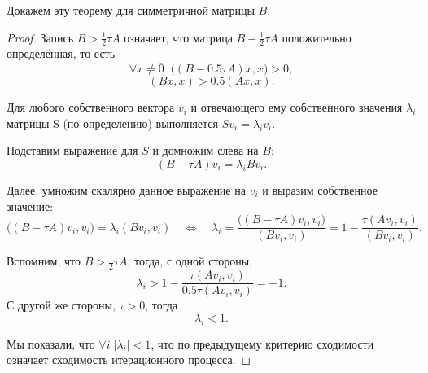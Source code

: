 \documentclass{article}
\begin{document}
Докажем эту теорему для симметричной матрицы $B$.

\begin{proof}
	Запись $B>\frac{1}{2}\tau A$ означает, что матрица $B-\frac{1}{2}\tau A$
	положительно определённая, то есть
	\[\forall x\ne\overline{0}\;\; \big((B-0.5\tau A)x,x\big)>0,\]
	\[(Bx,x)>0.5(Ax,x).\]

	Для любого собственного вектора $v_i$ и отвечающего ему собственного
	значения $\lambda_i$ матрицы S (по определению) выполняется
	$Sv_i=\lambda_iv_i$.

	Подставим выражение для $S$ и домножим слева на $B$:
	\[(B-\tau A)v_i=\lambda_iBv_i.\]

	Далее, умножим скалярно данное выражение на $v_i$ и выразим собственное
	значение:
	\[\big((B-\tau A)v_i, v_i\big)=\lambda_i(Bv_i,v_i)\quad\Leftrightarrow
	\quad\lambda_i=\frac{\big((B-\tau A)v_i, v_i\big)}{(Bv_i,v_i)}=
	1-\frac{\tau(Av_i, v_i)}{(Bv_i,v_i)}.\]

	Вспомним, что $B>\frac{1}{2}\tau A$, тогда, с одной стороны,
	\[\lambda_i>1-\frac{\tau(Av_i, v_i)}{0.5\tau(Av_i, v_i)}=-1.\]
	С другой же стороны, $\tau>0$, тогда
	\[\lambda_i<1.\]

	Мы показали, что $\forall i\; |\lambda_i|<1$, что по предыдущему
	критерию сходимости означает сходимость итерационного процесса.
\end{proof}
\end{document}
